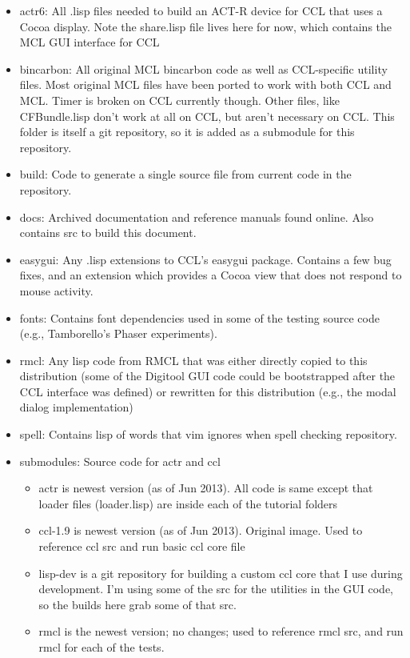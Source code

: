 \documentclass[12pt]{article} %
\begin{document}
\begin{itemize}

\item actr6: All .lisp files needed to build an ACT-R device for CCL that uses a Cocoa display. Note the share.lisp file lives here for now, which contains the MCL GUI interface for CCL

\item bincarbon:
  All original MCL bincarbon code as well as CCL-specific utility files. 
  Most original MCL files have been ported to work with both CCL and MCL.
  Timer is broken on CCL currently though.
  Other files, like CFBundle.lisp don't work at all on CCL, but aren't necessary on CCL.
  This folder is itself a git repository, so it is added as a submodule for this repository.

\item build: Code to generate a single source file from current code in the repository.

\item docs:
  Archived documentation and reference manuals found online.
  Also contains src to build this document.

\item easygui:
  Any .lisp extensions to CCL's easygui package.
  Contains a few bug fixes, and an extension which provides a Cocoa view that does not respond to mouse activity.

\item fonts: Contains font dependencies used in some of the testing source code (e.g., Tamborello's Phaser experiments).

\item rmcl:
  Any lisp code from RMCL that was either directly copied to this distribution (some of the Digitool GUI code could be bootstrapped after the CCL interface was defined)
  or rewritten for this distribution (e.g., the modal dialog implementation)

\item spell: Contains lisp of words that vim ignores when spell checking repository.

\item submodules: Source code for actr and ccl
	\begin{itemize}
	\item actr is newest version (as of Jun 2013). All code is same except that loader files (loader.lisp) are inside each of the tutorial folders
	\item ccl-1.9 is newest version (as of Jun 2013). Original image. Used to reference ccl src and run basic ccl core file
	\item lisp-dev is a git repository for building a custom ccl core that I use during development.
	  I'm using some of the src for the utilities in the GUI code, so the builds here grab some of that src.
	\item rmcl is the newest version; no changes; used to reference rmcl src, and run rmcl for each of the tests.
	\end{itemize}


\end{itemize}
\end{document}
